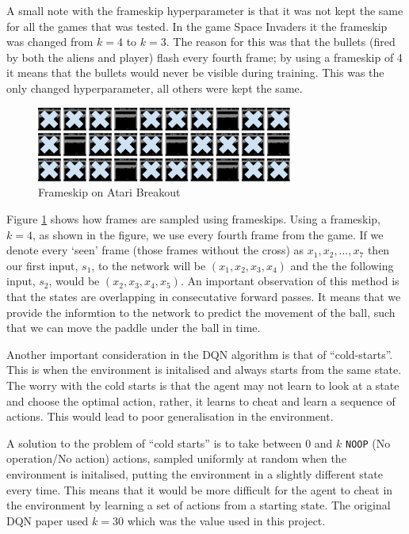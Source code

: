 A small note with the frameskip hyperparameter is that it was not kept the same for all the games that was tested. In the game Space Invaders it the frameskip was changed from $k = 4$ to $k = 3$. The reason for this was that the bullets (fired by both the aliens and player) flash every fourth frame; by using a frameskip of 4 it means that the bullets would never be visible during training. This was the only changed hyperparameter, all others were kept the same.

\begin{figure}[htbp]
	\centering
	\includegraphics[width=0.75\textwidth]{chapters/chapter4/images/frameskip.png}
	\caption{Frameskip on Atari Breakout
		\label{fig:frameskip}
	}
\end{figure}

Figure \ref{fig:frameskip} shows how frames are sampled using frameskips. Using a frameskip, $k = 4$, as shown in the figure, we use every fourth frame from the game. If we denote every `seen' frame (those frames without the cross) as $x_1, x_2, \hdots, x_7$ then our first input, $s_1$, to the network will be $(x_1, x_2, x_3, x_4)$ and the the following input, $s_2$, would be $(x_2, x_3, x_4, x_5)$. An important observation of this method is that the states are overlapping in consecutative forward passes. It means that we provide the informtion to the network to predict the movement of the ball, such that we can move the paddle under the ball in time.

Another important consideration in the DQN algorithm is that of ``cold-starts''. This is when the environment is initalised and always starts from the same state. The worry with the cold starts is that the agent may not learn to look at a state and choose the optimal action, rather, it learns to cheat and learn a sequence of actions. This would lead to poor generalisation in the environment.

A solution to the problem of ``cold starts'' is to take between 0 and $k$ \texttt{NOOP} (No operation/No action) actions, sampled uniformly at random when the environment is initalised, putting the  environment in a slightly different state every time. This means that it would be more difficult for the agent to cheat in the environment by learning a set of actions from a starting state. The original DQN paper \cite{dqn} used $k = 30$ which was the value used in this project.

